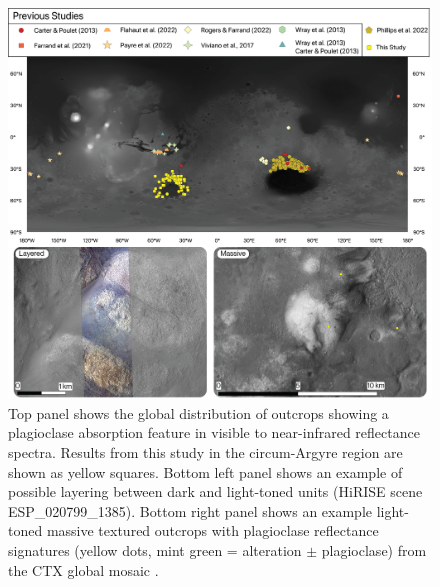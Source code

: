 \documentclass[11pt]{article}
\begin{document}
\begin{figure}
    \centering
    \label{fig:global_distribution}
    \includegraphics[width=\textwidth]
    {figures/01_Global_Context.png}
    \caption{Top panel shows the global distribution of outcrops showing a plagioclase absorption feature in visible to near-infrared reflectance spectra. Results from this study in the circum-Argyre region are shown as yellow squares. Bottom left panel shows an example of possible layering between dark and light-toned units (HiRISE scene ESP\_020799\_1385). Bottom right panel shows an example light-toned massive textured outcrops with plagioclase reflectance signatures (yellow dots, mint green = alteration $\pm$ plagioclase) from the CTX global mosaic \citep{Dickson2018}.}
\end{figure}
\end{document}
